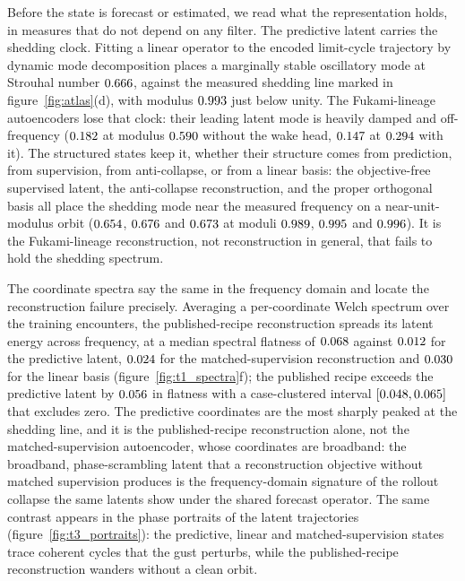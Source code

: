 Before the state is forecast or estimated, we read what the representation holds, in measures that do not depend on any filter. The predictive latent carries the shedding clock. Fitting a linear operator to the encoded limit-cycle trajectory by dynamic mode decomposition places a marginally stable oscillatory mode at Strouhal number $0.666$, against the measured shedding line marked in figure~\ref{fig:atlas}(d), with modulus $0.993$ just below unity. The Fukami-lineage autoencoders lose that clock: their leading latent mode is heavily damped and off-frequency ($0.182$ at modulus $0.590$ without the wake head, $0.147$ at $0.294$ with it). The structured states keep it, whether their structure comes from prediction, from supervision, from anti-collapse, or from a linear basis: the objective-free supervised latent, the anti-collapse reconstruction, and the proper orthogonal basis all place the shedding mode near the measured frequency on a near-unit-modulus orbit ($0.654$, $0.676$ and $0.673$ at moduli $0.989$, $0.995$ and $0.996$). It is the Fukami-lineage reconstruction, not reconstruction in general, that fails to hold the shedding spectrum.\re

The coordinate spectra say the same in the frequency domain and locate the reconstruction failure precisely. Averaging a per-coordinate Welch spectrum over the training encounters, the published-recipe reconstruction spreads its latent energy across frequency, at a median spectral flatness of $0.068$ against $0.012$ for the predictive latent, $0.024$ for the matched-supervision reconstruction and $0.030$ for the linear basis (figure~\ref{fig:t1_spectra}f); the published recipe exceeds the predictive latent by $0.056$ in flatness with a case-clustered interval $[0.048, 0.065]$ that excludes zero. The predictive coordinates are the most sharply peaked at the shedding line, and it is the published-recipe reconstruction alone, not the matched-supervision autoencoder, whose coordinates are broadband: the broadband, phase-scrambling latent that a reconstruction objective without matched supervision produces is the frequency-domain signature of the rollout collapse the same latents show under the shared forecast operator. The same contrast appears in the phase portraits of the latent trajectories (figure~\ref{fig:t3_portraits}): the predictive, linear and matched-supervision states trace coherent cycles that the gust perturbs, while the published-recipe reconstruction wanders without a clean orbit.\re

